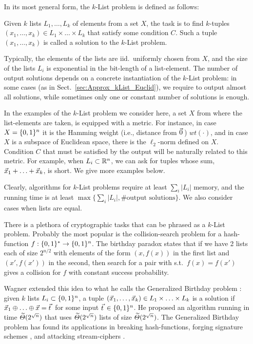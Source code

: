 In its most general form, the $k$-List problem is defined as follows:
\begin{definition} \label{def:kList}
	Given $k$ lists $L_1, \ldots, L_k$ of elements from a set $X$, the task is to find $k$-tuples $(x_1, \ldots, x_k) \in L_1 \times \ldots \times L_k$ that satisfy some condition $C$. Such a tuple $(x_1, \ldots, x_k)$ is called a solution to the $k$-List problem.
\end{definition}

Typically, the elements of the lists are iid.\ uniformly chosen from $X$, and the size of the lists $L_i$ is exponential in the bit-length of a list-element. The number of output solutions depends on a concrete instantiation of the $k$-List problem: in some cases (as in Sect.~\ref{sec:Approx_kList_Euclid}), we require to output almost all solutions, while sometimes only one or constant number of solutions is enough. 

In the examples of the $k$-List problem we consider here, a set $X$ from where the list-elements are taken, is equipped with a metric. For instance, in case $X = \{0,1 \}^{n}$ it is the Hamming weight (i.e., distance from $\zerovec$) $wt(\cdot)$, and in case $X$ is a subspace of Euclidean space, there is the $\ell_2$-norm defined on $X$. Condition $C$ that must be satisfied by the output will be naturally related to this metric. For example, when $L_i \subset {{\mathbb R}}^n$, we can ask for tuples whose sum, $\vec x_1 + \ldots + \vec x_k$, is short. We give more examples below.

Clearly, algorithms for $k$-List problems require at least $\sum_i |L_i|$ memory, and the running time is at least $\max\{\sum_i |L_i|, \# \text{output solutions}\}$. We also consider cases when lists are equal. 
 
There is a plethora of cryptographic tasks that can be phrased as a $k$-List problem. Probably the most popular is the collision-search problem for a hash-function $f:\{0,1 \}^{*} \rightarrow \{0,1 \}^{n}$. The birthday paradox states that if we have 2 lists each of size $2^{n/2}$ with elements of the form $(x, f(x))$ in the first list and $(x', f(x'))$ in the second, then search for a pair with s.t.\ $f(x)=f(x')$ gives a collision for $f$ with constant success probability.


Wagner extended this idea to what he calls the Generalized Birthday problem \cite{C:Wagner02}: given $k$ lists $L_i \subset \{0,1 \}^{n}$, a tuple $(\vec x_1, \ldots, \vec x_k) \in L_1 \times \ldots \times L_k$ is a solution if $\xvec_1 \oplus \ldots \oplus \xvec = \tvec$ for some input $\tvec \in \ZO{n}$. He proposed an algorithm running in time $\widetilde{\varTheta}(2^{\sqrt{n}})$ that uses $\widetilde{\varTheta}(2^{\sqrt{n}})$ lists of size $\widetilde{\varTheta}(2^{\sqrt{n}})$. The Generalized Birthday problem has found its applications in breaking hash-functions, forging signature schemes \cite{C:Wagner02}, and attacking stream-ciphers \cite{AC:NikSas15}.

